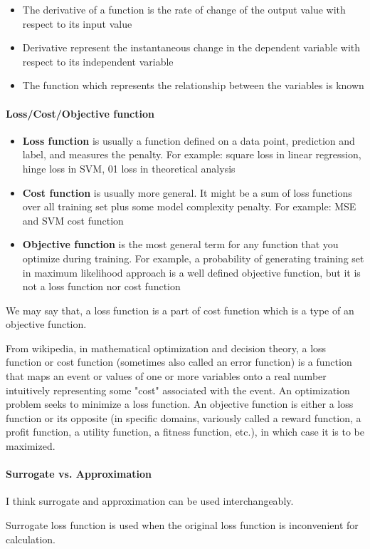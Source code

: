\documentclass[lang=en,mode=geye,device=normal,color=blue,14pt]{elegantnote}
\DeclareMathOperator*{\1}{\mathbbm{1}}
\begin{document}
\begin{itemize}
\item The derivative of a function is the rate of change of the output value with respect to its input value
\item Derivative represent the instantaneous change in the dependent variable with respect to its independent variable
\item The function which represents the relationship between the variables is known
\end{itemize}


\paragraph{Loss/Cost/Objective function}

\begin{itemize}
\item \textbf{Loss function} is usually a function defined on a data point, prediction and label, and measures the penalty. For example: square loss in linear regression, hinge loss in SVM, 01 loss in theoretical analysis
\item \textbf{Cost function} is usually more general. It might be a sum of loss functions over all training set plus some model complexity penalty. For example: MSE and SVM cost function
\item \textbf{Objective function} is the most general term for any function that you optimize during training. For example, a probability of generating training set in maximum likelihood approach is a well defined objective function, but it is not a loss function nor cost function
\end{itemize}

We may say that, a loss function is a part of cost function which is a type of an objective function.

From wikipedia, in mathematical optimization and decision theory, a loss function or cost function (sometimes also called an error function) is a function that maps an event or values of one or more variables onto a real number intuitively representing some "cost" associated with the event. An optimization problem seeks to minimize a loss function. An objective function is either a loss function or its opposite (in specific domains, variously called a reward function, a profit function, a utility function, a fitness function, etc.), in which case it is to be maximized.

\paragraph{Surrogate vs. Approximation}

I think surrogate and approximation can be used interchangeably.

Surrogate loss function is used when the original loss function is inconvenient for calculation.



\end{document}
